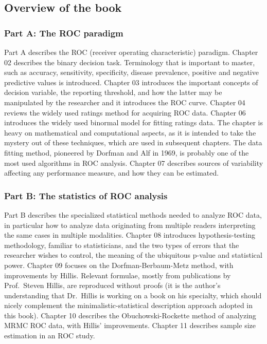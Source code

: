 \documentclass[
]{book}
\begin{document}
\hypertarget{overview-of-the-book}{%
\subsection{Overview of the book}\label{overview-of-the-book}}

\hypertarget{part-a-the-roc-paradigm}{%
\subsubsection{Part A: The ROC paradigm}\label{part-a-the-roc-paradigm}}

Part A describes the ROC (receiver operating characteristic) paradigm. Chapter 02 describes the binary decision task. Terminology that is important to master, such as accuracy, sensitivity, specificity, disease prevalence, positive and negative predictive values is introduced. Chapter 03 introduces the important concepts of decision variable, the reporting threshold, and how the latter may be manipulated by the researcher and it introduces the ROC curve. Chapter 04 reviews the widely used ratings method for acquiring ROC data. Chapter 06 introduces the widely used binormal model for fitting ratings data. The chapter is heavy on mathematical and computational aspects, as it is intended to take the mystery out of these techniques, which are used in subsequent chapters. The data fitting method, pioneered by Dorfman and Alf in 1969, is probably one of the most used algorithms in ROC analysis. Chapter 07 describes sources of variability affecting any performance measure, and how they can be estimated.

\hypertarget{part-b-the-statistics-of-roc-analysis}{%
\subsubsection{Part B: The statistics of ROC analysis}\label{part-b-the-statistics-of-roc-analysis}}

Part B describes the specialized statistical methods needed to analyze ROC data, in particular how to analyze data originating from multiple readers interpreting the same cases in multiple modalities. Chapter 08 introduces hypothesis-testing methodology, familiar to statisticians, and the two types of errors that the researcher wishes to control, the meaning of the ubiquitous p-value and statistical power. Chapter 09 focuses on the Dorfman-Berbaum-Metz method, with improvements by Hillis. Relevant formulae, mostly from publications by Prof.~Steven Hillis, are reproduced without proofs (it is the author's understanding that Dr.~Hillis is working on a book on his specialty, which should nicely complement the minimalistic-statistical description approach adopted in this book). Chapter 10 describes the Obuchowski-Rockette method of analyzing MRMC ROC data, with Hillis' improvements. Chapter 11 describes sample size estimation in an ROC study.
\end{document}
